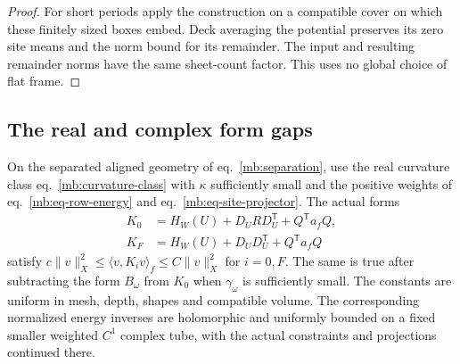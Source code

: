 \documentclass[11pt,letterpaper,reqno]{amsart}
\makeatletter
\numberwithin{equation}{section}
\renewcommand{\eqref}[1]{\textup{eq.~\ref{#1}}}
\theoremstyle{definition}
\newcommand{\ms@majorstart}{%
  \pushQED{\qed}\renewcommand{\qedsymbol}{$\blacksquare\square$}}
\newenvironment{theorem}[1][]{\ms@majorstart\ms@theorem[#1]}
  {\popQED\endms@theorem}
\theoremstyle{remark}
\makeatother
\begin{document}
\begin{proof}
For short periods apply the construction on a compatible
cover on which these finitely sized boxes embed. Deck
averaging the potential preserves its zero site means and
the norm bound for its remainder. The input and resulting
remainder norms have the same sheet-count factor. This
uses no global choice of flat frame.
\end{proof}

\subsection{The real and complex form gaps}

\begin{theorem}[Uniform layered form gaps]\label{mb:thm-layered-gap}
On the separated aligned geometry of \eqref{mb:separation},
use the real curvature class \eqref{mb:curvature-class}
with \(\kappa\) sufficiently small and the positive weights
of \eqref{mb:eq-row-energy} and \eqref{mb:eq-site-projector}.
The actual forms
\begin{equation}\label{mb:eq-layered-forms}
 \begin{split}
 K_0&=H_W(U)+D_URD_U^{\mathsf T}+Q^{\mathsf T}a_fQ,\\
 K_F&=H_W(U)+D_UD_U^{\mathsf T}+Q^{\mathsf T}a_fQ
 \end{split}
\end{equation}
satisfy \(c\|v\|_X^2\le\langle v,K_i v\rangle_f\le C\|v\|_X^2\)
for \(i=0,F\). The same is true after subtracting the form
\(B_\omega\) from \(K_0\) when
\(\gamma_\omega\) is sufficiently small. The constants are
uniform in mesh, depth, shapes and compatible volume.
The corresponding normalized energy inverses are holomorphic
and uniformly bounded on a fixed smaller weighted \(C^1\)
complex tube, with the actual constraints and projections
continued there.
\end{theorem}
\end{document}
